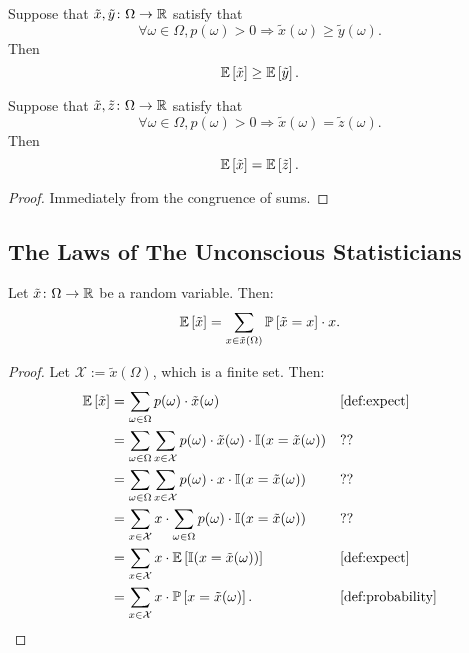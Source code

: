 \begin{theorem} \label{thm:exp-monotone}
  Suppose that $\tilde{x}, \tilde{y} \colon \Omega \to \mathbb{R}$ satisfy that
  \[
    \forall \omega \in \Omega, p(\omega ) > 0 \Rightarrow \tilde{x}(\omega) \ge \tilde{y}(\omega).
  \]
  Then
  \[
   \mathbb{E}\left[\tilde{x}\right] \ge \mathbb{E}\left[\tilde{y}\right] .
  \]
\end{theorem}


\begin{theorem} \label{thm:exp-congr}
  Suppose that $\tilde{x}, \tilde{z} \colon \Omega \to \mathbb{R}$ satisfy that
  \[
     \forall \omega \in \Omega, p(\omega) > 0 \Rightarrow \tilde{x}(\omega) = \tilde{z}(\omega).
  \]
  Then
  \[
   \mathbb{E} \left[ \tilde{x} \right] = \mathbb{E} \left[ \tilde{z} \right].
  \]
\end{theorem}
\begin{proof}
Immediately from the congruence of sums.
\end{proof}
\subsection{The Laws of The Unconscious Statisticians}

\begin{theorem} \label{thm:exp-sum-val}
Let $\tilde{x} \colon \Omega \to \mathbb{R} $ be a random variable. Then:
\[
\mathbb{E} \left[ \tilde{x} \right]
=
\sum_{x\in \tilde{x}(\Omega)} \mathbb{P} \left[ \tilde{x} = x \right] \cdot  x. 
\]
\end{theorem}
\begin{proof}
Let $\mathcal{X} := \tilde{x}(\Omega)$, which is a finite set. Then:
\begin{align*}
\E \left[ \tilde{x} \right]
&= \sum_{\omega \in \Omega } p(\omega ) \cdot \tilde{x}(\omega) && \text{\cref{def:expect}} \\
&= \sum_{\omega \in \Omega } \sum_{x\in \mathcal{X}} p(\omega ) \cdot \tilde{x}(\omega) \cdot \I(x =  \tilde{x}(\omega)) && \text{??} \\
&= \sum_{\omega \in \Omega } \sum_{x\in \mathcal{X}} p(\omega ) \cdot x \cdot \I(x =  \tilde{x}(\omega)) && \text{??} \\
&= \sum_{x\in \mathcal{X}} x \cdot \sum_{\omega \in \Omega }  p(\omega ) \cdot  \I(x =  \tilde{x}(\omega))  && \text{??}\\
&= \sum_{x\in \mathcal{X}} x \cdot \E \left[  \I(x =  \tilde{x}(\omega)) \right] && \text{\cref{def:expect}} \\
&= \sum_{x\in \mathcal{X}} x \cdot \PP \left[x =  \tilde{x}(\omega) \right]. && \text{\cref{def:probability}} 
\end{align*}
\end{proof}


